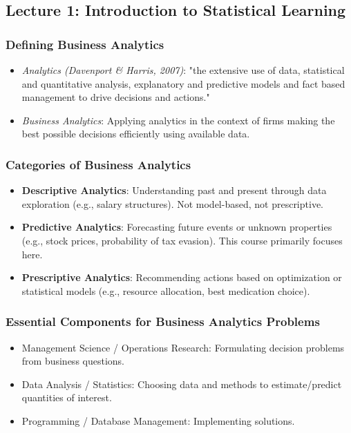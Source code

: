 \documentclass[12pt,a4paper]{article}
\begin{document}
\subsection{Lecture 1: Introduction to Statistical Learning }
    \subsubsection{Defining Business Analytics}
        \begin{itemize}
            \item \textit{Analytics (Davenport \& Harris, 2007)}: "the extensive use of data, statistical and quantitative analysis, explanatory and predictive models and fact based management to drive decisions and actions."
            \item \textit{Business Analytics}: Applying analytics in the context of firms making the best possible decisions efficiently using available data.
        \end{itemize}

    \subsubsection{Categories of Business Analytics }
        \begin{itemize}
            \item \textbf{Descriptive Analytics}: Understanding past and present through data exploration (e.g., salary structures). Not model-based, not prescriptive.
            \item \textbf{Predictive Analytics}: Forecasting future events or unknown properties (e.g., stock prices, probability of tax evasion). This course primarily focuses here.
            \item \textbf{Prescriptive Analytics}: Recommending actions based on optimization or statistical models (e.g., resource allocation, best medication choice).
        \end{itemize}

    \subsubsection{Essential Components for Business Analytics Problems }
        \begin{itemize}
            \item Management Science / Operations Research: Formulating decision problems from business questions.
            \item Data Analysis / Statistics: Choosing data and methods to estimate/predict quantities of interest.
            \item Programming / Database Management: Implementing solutions.
        \end{itemize}
\end{document}
